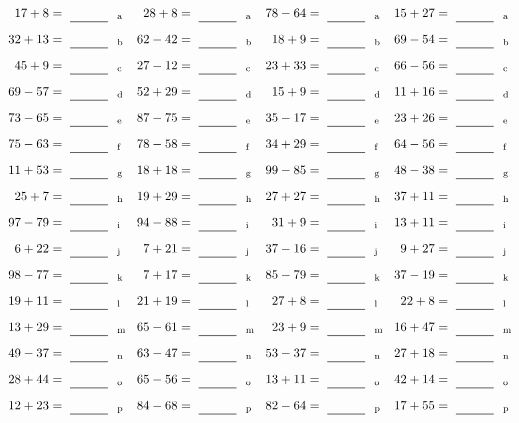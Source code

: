 \documentclass
[
  draft    = true,
  fontsize = 11pt,
  parskip  = half-
]
{scrartcl}
\begin{document}
\clearpage
\begin{align*}
    \pline{17+8}&=\rline{a}
  & \pline{28+8}&=\rline{a}
  & \pline{78-64}&=\rline{a}
  & \pline{15+27}&=\rline{a} \\[1ex]
    \pline{32+13}&=\rline{b}
  & \pline{62-42}&=\rline{b}
  & \pline{18+9}&=\rline{b}
  & \pline{69-54}&=\rline{b} \\[1ex]
    \pline{45+9}&=\rline{c}
  & \pline{27-12}&=\rline{c}
  & \pline{23+33}&=\rline{c}
  & \pline{66-56}&=\rline{c} \\[1ex]
    \pline{69-57}&=\rline{d}
  & \pline{52+29}&=\rline{d}
  & \pline{15+9}&=\rline{d}
  & \pline{11+16}&=\rline{d} \\[1ex]
    \pline{73-65}&=\rline{e}
  & \pline{87-75}&=\rline{e}
  & \pline{35-17}&=\rline{e}
  & \pline{23+26}&=\rline{e} \\[1ex]
    \pline{75-63}&=\rline{f}
  & \pline{78-58}&=\rline{f}
  & \pline{34+29}&=\rline{f}
  & \pline{64-56}&=\rline{f} \\[1ex]
    \pline{11+53}&=\rline{g}
  & \pline{18+18}&=\rline{g}
  & \pline{99-85}&=\rline{g}
  & \pline{48-38}&=\rline{g} \\[1ex]
    \pline{25+7}&=\rline{h}
  & \pline{19+29}&=\rline{h}
  & \pline{27+27}&=\rline{h}
  & \pline{37+11}&=\rline{h} \\[1ex]
    \pline{97-79}&=\rline{i}
  & \pline{94-88}&=\rline{i}
  & \pline{31+9}&=\rline{i}
  & \pline{13+11}&=\rline{i} \\[1ex]
    \pline{6+22}&=\rline{j}
  & \pline{7+21}&=\rline{j}
  & \pline{37-16}&=\rline{j}
  & \pline{9+27}&=\rline{j} \\[1ex]
    \pline{98-77}&=\rline{k}
  & \pline{7+17}&=\rline{k}
  & \pline{85-79}&=\rline{k}
  & \pline{37-19}&=\rline{k} \\[1ex]
    \pline{19+11}&=\rline{l}
  & \pline{21+19}&=\rline{l}
  & \pline{27+8}&=\rline{l}
  & \pline{22+8}&=\rline{l} \\[1ex]
    \pline{13+29}&=\rline{m}
  & \pline{65-61}&=\rline{m}
  & \pline{23+9}&=\rline{m}
  & \pline{16+47}&=\rline{m} \\[1ex]
    \pline{49-37}&=\rline{n}
  & \pline{63-47}&=\rline{n}
  & \pline{53-37}&=\rline{n}
  & \pline{27+18}&=\rline{n} \\[1ex]
    \pline{28+44}&=\rline{o}
  & \pline{65-56}&=\rline{o}
  & \pline{13+11}&=\rline{o}
  & \pline{42+14}&=\rline{o} \\[1ex]
    \pline{12+23}&=\rline{p}
  & \pline{84-68}&=\rline{p}
  & \pline{82-64}&=\rline{p}
  & \pline{17+55}&=\rline{p}
\end{align*}
\end{document}
